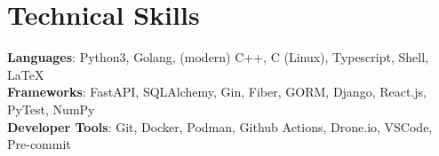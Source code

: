 \documentclass[letterpaper,11pt]{article}
\begin{document}
\section{Technical Skills}
 \begin{itemize}[leftmargin=0.15in, label={}]
    \small{\item{
     \textbf{Languages}{: Python3, Golang, (modern) C++, C (Linux), Typescript, Shell, \LaTeX} \\
     \textbf{Frameworks}{: FastAPI, SQLAlchemy, Gin, Fiber, GORM, Django, React.js, PyTest, NumPy} \\
     \textbf{Developer Tools}{: Git, Docker, Podman, Github Actions, Drone.io, VSCode, Pre-commit} \\
    }}
 \end{itemize}


\end{document}

